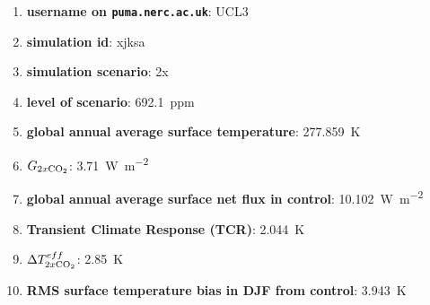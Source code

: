 \documentclass{article}
\begin{document}
\begin{enumerate}
    \item \textbf{username on \texttt{puma.nerc.ac.uk}}: UCL3
    \item \textbf{simulation id}: xjksa
    \item \textbf{simulation scenario}: 2x
    \item \textbf{ level of scenario}: \SI{692.1}{ppm}
    \item \textbf{global annual average surface temperature}: \SI{277.859}{K}
    \item \textbf{$G_{2x\ce{CO2}}$}: \SI{3.71}{W.m^{-2}}
    \item \textbf{global annual average surface net flux in control}: \SI{10.102}{W.m^{-2}}
    \item \textbf{Transient Climate Response (TCR)}: \SI{2.044}{K}
    \item \textbf{$\Delta T^{eff}_{2x\ce{CO2}}$}: \SI{2.85}{K}
    \item \textbf{RMS surface temperature bias in DJF from control}: \SI{3.943}{K} %
\end{enumerate}
\end{document}
